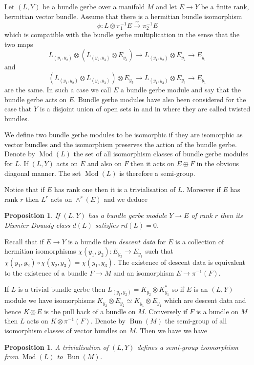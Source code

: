 \documentclass[a4paper,reqno]{amsart}
\DeclareMathOperator{\Mod}{Mod}
\DeclareMathOperator{\Bun}{Bun}
\theoremstyle{plain}
\newtheorem{proposition}[theorem]{Proposition}
\theoremstyle{definition}
\theoremstyle{remark}
\numberwithin{equation}{section}
\numberwithin{figure}{section}
\newcommand{\<}{\langle}
\renewcommand{\>}{\rangle}
\begin{document}
Let $(L, Y)$ be a bundle gerbe over a manifold $M$ and let $E \to Y$
be a finite rank, hermitian vector bundle. Assume that there is a
hermitian bundle
isomorphism
\begin{equation}
\label{eq:bgmod}
\phi \colon L\otimes \pi_1^{-1}E \stackrel{\sim}{\to}
\pi_2^{-1}E
\end{equation}
which is compatible with the bundle gerbe multiplication in the sense
that the two maps
$$
L_{(y_1, y_2)} \otimes (L_{(y_2, y_3)} \otimes E_{y_3} ) \to
L_{(y_1, y_2)} \otimes E_{y_2} \to E_{y_1}
$$
and
$$
(L_{(y_1, y_2)} \otimes L_{(y_2, y_3)} )\otimes E_{y_3} \to
L_{(y_1, y_3)} \otimes E_{y_3} \to E_{y_1}
$$
are the same.  In such a case we call $E$ a  bundle gerbe module and say
that the bundle gerbe acts on $E$.  Bundle gerbe modules have also
been considered for the case that $Y$ is a disjoint
union of open sets in \cite{LupUri} and in \cite{Mac} where they are called
twisted bundles.

We define two bundle gerbe modules to be isomorphic if they are
isomorphic as vector bundles and the isomorphism
preserves the action of the bundle gerbe.
Denote by $\Mod(L)$ the set of all isomorphism classes of
bundle gerbe modules for $L$.
If $(L, Y)$ acts on $E$ and also on $F$ then it acts on $E\oplus F$
in the obvious diagonal manner.  The set  $\Mod(L)$ is therefore
a semi-group.

Notice that if $E$ has rank one then it is a trivialisation
of $L$. Moreover if $E$  has  rank $r$ then $L^r$
acts on $\wedge^r(E)$ and we deduce
\begin{proposition}
\label{prop:torsion}
If $(L, Y)$ has a bundle gerbe module $Y \to E$ of rank $r$ then its
Dixmier-Douady class $d(L)$ satisfies $r d(L) = 0$.
\end{proposition}


Recall that if $E \to Y$ is a bundle then {\em descent data} \cite{Bry}
for $E$ is a collection of   hermitian isomorphisms
$\chi(y_1, y_2) \colon E_{y_2} \to E_{y_1}$ such that $\chi(y_1, y_2) \circ
\chi(y_2, y_3) = \chi(y_1, y_3)$.  The existence of descent data
is equivalent to the existence of a bundle $F \to M$ and an
isomorphism $E \to \pi^{-1}(F)$.

If $L$ is a trivial bundle gerbe then $L_{(y_1, y_2)} = K_{y_2} \otimes
K_{y_1}^*$
so if $E$ is an $(L, Y)$ module we have isomorphisms $K_{y_2} \otimes
E_{y_2} \simeq
K_{y_1} \otimes E_{y_1} $ which are descent data and hence $K \otimes E$ is the
pull back of a bundle on $M$.
     Conversely
if $F$ is a bundle on $M$ then $L$ acts on $K\otimes \pi^{-1}(F)$. Denote
by $\Bun(M)$ the semi-group of all isomorphism classes of vector
bundles on $M$. Then we have
we have
\begin{proposition}
\label{prop:trivialcase}
A trivialisation of  $(L, Y)$ defines  a semi-group
isomorphism from $\Mod(L)$ to $\Bun(M)$.
\end{proposition}
\end{document}

